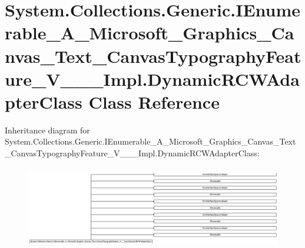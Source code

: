 \hypertarget{class_system_1_1_collections_1_1_generic_1_1_i_enumerable___a___microsoft___graphics___canvas___6c99eed25713652748083299b1def931}{}\section{System.\+Collections.\+Generic.\+I\+Enumerable\+\_\+\+A\+\_\+\+Microsoft\+\_\+\+Graphics\+\_\+\+Canvas\+\_\+\+Text\+\_\+\+Canvas\+Typography\+Feature\+\_\+\+V\+\_\+\+\_\+\+\_\+\+Impl.\+Dynamic\+R\+C\+W\+Adapter\+Class Class Reference}
\label{class_system_1_1_collections_1_1_generic_1_1_i_enumerable___a___microsoft___graphics___canvas___6c99eed25713652748083299b1def931}
Inheritance diagram for System.\+Collections.\+Generic.\+I\+Enumerable\+\_\+\+A\+\_\+\+Microsoft\+\_\+\+Graphics\+\_\+\+Canvas\+\_\+\+Text\+\_\+\+Canvas\+Typography\+Feature\+\_\+\+V\+\_\+\+\_\+\+\_\+\+Impl.\+Dynamic\+R\+C\+W\+Adapter\+Class\+:\begin{figure}[H]
\begin{center}
\leavevmode
\includegraphics[height=3.662307cm]{class_system_1_1_collections_1_1_generic_1_1_i_enumerable___a___microsoft___graphics___canvas___6c99eed25713652748083299b1def931}
\end{center}
\end{figure}
